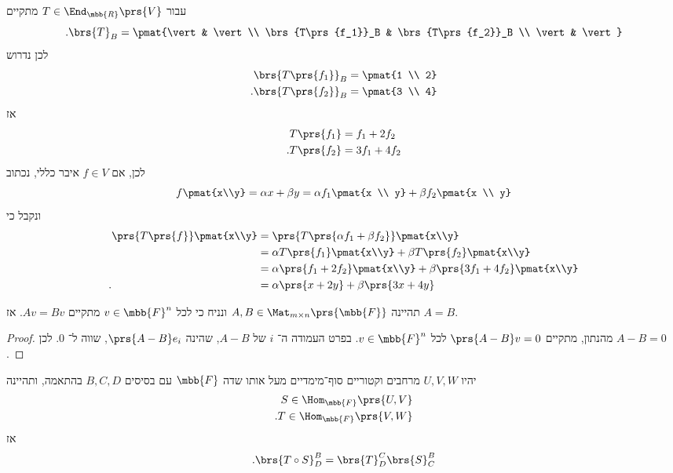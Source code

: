 \documentclass[a4paper,10pt,twoside,openany]{book}
\begin{document}
\begin{solution}
עבור
$T \in \End_{\mbb{R}}\prs{V}$
מתקיים
\[\text{.} \brs{T}_B = \pmat{\vert & \vert \\ \brs{T\prs{f_1}}_B & \brs{T\prs{f_2}}_B \\ \vert & \vert}\]
לכן נדרוש
\begin{align*}
\brs{T\prs{f_1}}_B &= \pmat{1 \\ 2} \\
\text{.} \brs{T\prs{f_2}}_B &= \pmat{3 \\ 4}
\end{align*}
אז
\begin{align*}
T\prs{f_1} &= f_1 + 2 f_2 \\
\text{.} T\prs{f_2} &= 3 f_1 + 4 f_2
\end{align*}
לכן, אם
$f \in V$
איבר כללי, נכתוב
\[f\pmat{x\\y} = \alpha x + \beta y = \alpha f_1 \pmat{x \\ y} + \beta f_2\pmat{x \\ y}\]
ונקבל כי
\begin{align*}
\prs{T\prs{f}}\pmat{x\\y} &= \prs{T\prs{\alpha f_1 + \beta f_2}}\pmat{x\\y}
\\&= \alpha T\prs{f_1}\pmat{x\\y} + \beta T\prs{f_2} \pmat{x\\y}
\\&= \alpha \prs{f_1 + 2 f_2}\pmat{x\\y} + \beta \prs{3 f_1 + 4 f_2} \pmat{x\\y}
\\ \text{.} \hphantom{\prs{T\prs{f}}\pmat{x\\y}} &= \alpha \prs{x + 2 y} + \beta \prs{3 x + 4y}
\end{align*}
\end{solution}

\begin{proposition}
תהיינה
$A,B \in \Mat_{m \times n}\prs{\mbb{F}}$
ונניח כי לכל
$v \in \mbb{F}^n$
מתקיים
$Av = Bv$.
אז
$A = B$.
\end{proposition}

\begin{proof}
מהנתון, מתקיים
$\prs{A - B}v = 0$
לכל
$v \in \mbb{F}^n$.
בפרט העמודה ה־%
$i$
של
$A-B$,
שהינה
$\prs{A - B}e_i$,
שווה ל־%
$0$.
לכן
$A - B = 0$.
\end{proof}

\begin{proposition}
יהיו
$U,V,W$
מרחבים וקטוריים סוף־מימדיים מעל אותו שדה
$\mbb{F}$
עם בסיסים
$B,C,D$
בהתאמה,
ותהיינה
\begin{align*}
S \in \Hom_{\mbb{F}}\prs{U,V} \\
\text{.} T \in \Hom_{\mbb{F}}\prs{V,W}
\end{align*}
אז
\[\text{.} \brs{T \circ S}^B_D = \brs{T}^C_D \brs{S}^B_C\]
\end{proposition}
\end{document}
